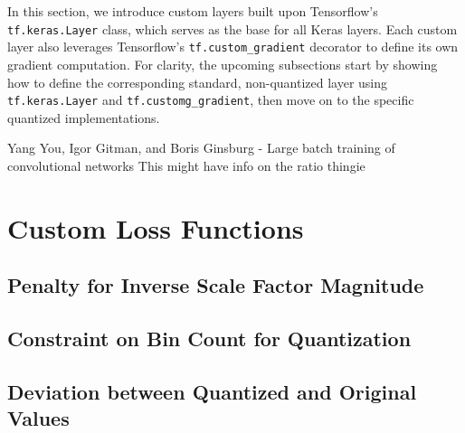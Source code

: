 In this section, we introduce custom layers built upon Tensorflow's \texttt{tf.keras.Layer} class, 
which serves as the base for all Keras layers. Each custom layer also leverages Tensorflow's 
\texttt{tf.custom\_gradient} decorator to define its own gradient computation.
For clarity, the upcoming subsections start by showing how to define the corresponding standard, 
non-quantized layer using \texttt{tf.keras.Layer} and \texttt{tf.customg\_gradient},
then move on to the specific quantized implementations.

Yang You, Igor Gitman, and Boris Ginsburg - Large batch training of convolutional networks
This might have info on the ratio thingie

\section{Custom Loss Functions}
\label{sec:customloss}

\subsection{Penalty for Inverse Scale Factor Magnitude} 
\label{subsec:scaleinverse}

\subsection{Constraint on Bin Count for Quantization}
\label{subsec:maxbin}

\subsection{Deviation between Quantized and Original Values}
\label{subsec:difference}